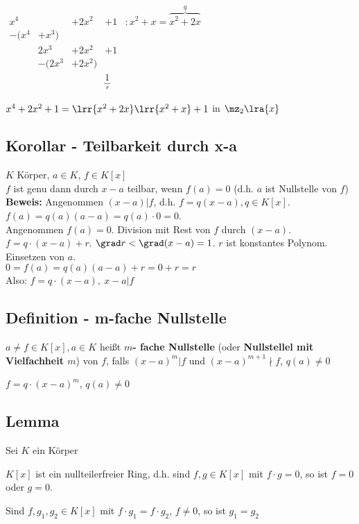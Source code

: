 			$\begin{array}{rrlrl}
				x^4		&		&+2x^2	&+1		&:x^2+x=\overbrace{x^2+2x}^{q}\\
				-(x^4	&+x^3)			&\\
						&2x^3	&+2x^2	&+1\\
						&-(2x^3	&+2x^2)	&\\
						&		&		&\underbrace{1}_{r}
			\end{array}$
			
			$x^4+2x^2+1 =\lrr{x^2+2x}\lrr{x^2+x}+1$ in $\mz_2\lra{x}$
	\subExEnd
	
	\subsection{Korollar - Teilbarkeit durch x-a}
	
	$K$ Körper, $a\in K$, $f\in K[x]$\\
	$f$ ist genu dann durch $x-a$ teilbar, wenn $f(a)=0$ (d.h. $a$ ist Nullstelle von $f$)\\
	\textbf{Beweis:} Angenommen $(x-a)|f$, d.h. $f=q(x-a),q\in K[x]$. $f(a)=q(a)(a-a)=q(a)\cdot 0=0$.\\
	Angenommen $f(a)=0$. Division mit Rest von $f$ durch $(x-a)$.\\
	$f=q\cdot(x-a)+r$. $\grad r<\grad(x-a)=1$. $r$ ist konstantes Polynom. Einsetzen von $a$.\\
	$0=f(a)=q(a)(a-a)+r=0+r=r$\\
	Also: $f=q\cdot(x-a),\ x-a|f$
	
	\subsection{Definition - m-fache Nullstelle}
	
	$a\neq f\in K[x],a\in K$ heißt \textbf{$m$- fache Nullstelle} (oder \textbf{Nullstellel mit Vielfachheit $m$}) von $f$, falls $(x-a)^m|f$ und $(x-a)^{m+1}\nmid f$, $q(a)\neq 0$
	
	$f=q\cdot(x-a)^m$, $q(a)\neq 0$
	
	\subsection{Lemma}
	
	Sei $K$ ein Körper
	\item $K[x]$ ist ein nullteilerfreier Ring, d.h. sind $f,g\in K[x]$ mit $f\cdot g=0$, so ist $f=0$ oder $g=0$.
	\item Sind $f,g_1,g_2\in K[x]$ mit $f\cdot g_1=f\cdot g_2$, $f\neq 0$, so ist $g_1=g_2$
	\subExEnd
	

